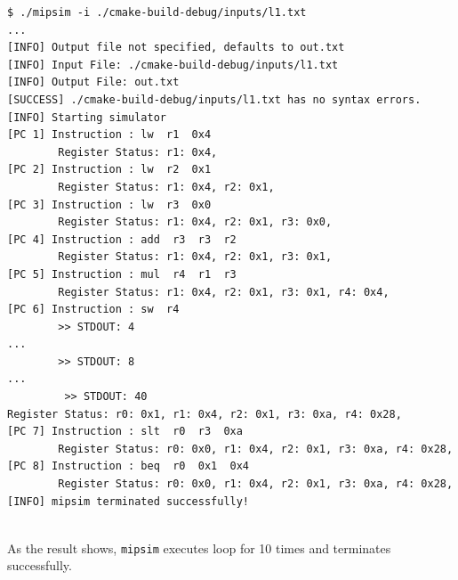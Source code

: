 \documentclass{homework}
\begin{document}
\begin{center}
\begin{code}
\begin{verbatim}
$ ./mipsim -i ./cmake-build-debug/inputs/l1.txt
...
[INFO] Output file not specified, defaults to out.txt
[INFO] Input File: ./cmake-build-debug/inputs/l1.txt
[INFO] Output File: out.txt
[SUCCESS] ./cmake-build-debug/inputs/l1.txt has no syntax errors.
[INFO] Starting simulator
[PC 1] Instruction : lw  r1  0x4
        Register Status: r1: 0x4,
[PC 2] Instruction : lw  r2  0x1
        Register Status: r1: 0x4, r2: 0x1,
[PC 3] Instruction : lw  r3  0x0
        Register Status: r1: 0x4, r2: 0x1, r3: 0x0,
[PC 4] Instruction : add  r3  r3  r2
        Register Status: r1: 0x4, r2: 0x1, r3: 0x1,
[PC 5] Instruction : mul  r4  r1  r3
        Register Status: r1: 0x4, r2: 0x1, r3: 0x1, r4: 0x4,
[PC 6] Instruction : sw  r4
        >> STDOUT: 4
...
        >> STDOUT: 8
...
         >> STDOUT: 40
Register Status: r0: 0x1, r1: 0x4, r2: 0x1, r3: 0xa, r4: 0x28,
[PC 7] Instruction : slt  r0  r3  0xa
        Register Status: r0: 0x0, r1: 0x4, r2: 0x1, r3: 0xa, r4: 0x28,
[PC 8] Instruction : beq  r0  0x1  0x4
        Register Status: r0: 0x0, r1: 0x4, r2: 0x1, r3: 0xa, r4: 0x28,
[INFO] mipsim terminated successfully!
\end{verbatim}
\end{code}
\end{center}
\\
As the result shows, \texttt{mipsim} executes loop for 10 times and terminates successfully. 
\end{document}
